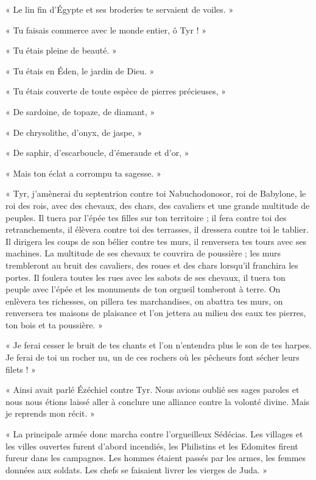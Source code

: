 \documentclass[a4paper, 11pt, oneside, polutonikogreek, french]{article}
\begin{document}
« Le lin fin d'Égypte et ses broderies te servaient de voiles. »

« Tu faisais commerce avec le monde entier, ô Tyr ! »

« Tu étais pleine de beauté. »

« Tu étais en Éden, le jardin de Dieu. »

« Tu étais couverte de toute espèce de pierres précieuses, »

« De sardoine, de topaze, de diamant, »

« De chrysolithe, d'onyx, de jaspe, »

« De saphir, d'escarboucle, d'émeraude et d'or, »

« Mais ton éclat a corrompu ta sagesse. »

« Tyr, j'amènerai du septentrion contre toi Nabuchodonosor, roi de Babylone, le roi des rois, avec des chevaux, des chars, des cavaliers et une grande multitude de peuples. Il tuera par l'épée tes filles sur ton territoire ; il fera contre toi des retranchements, il élèvera contre toi des terrasses, il dressera contre toi le tablier. Il dirigera les coups de son bélier contre tes murs, il renversera tes tours avec ses machines. La multitude de ses chevaux te couvrira de poussière ; les murs trembleront au bruit des cavaliers, des roues et des chars lorsqu'il franchira les portes. Il foulera toutes les rues avec les sabots de ses chevaux, il tuera ton peuple avec l'épée et les monuments de ton orgueil tomberont à terre. On enlèvera tes richesses, on pillera tes marchandises, on abattra tes murs, on renversera tes maisons de plaisance et l'on jettera au milieu des eaux tes pierres, ton bois et ta poussière. »

« Je ferai cesser le bruit de tes chants et l'on n'entendra plus le son de tes harpes. Je ferai de toi un rocher nu, un de ces rochers où les pêcheurs font sécher leurs filets ! »

\bigskip
\centerline{\EightStarTaper}
\centerline{\EightStarTaper\EightStarTaper}
\bigskip

« Ainsi avait parlé Ézéchiel contre Tyr. Nous avions oublié ses sages paroles et nous nous étions laissé aller à conclure une alliance contre la volonté divine. Mais je reprends mon récit. »

« La principale armée donc marcha contre l'orgueilleux Sédécias. Les villages et les villes ouvertes furent d'abord incendiés, les Philistins et les Edomites firent fureur dans les campagnes. Les hommes étaient passés par les armes, les femmes données aux soldats. Les chefs se faisaient livrer les vierges de Juda. »
\end{document}
